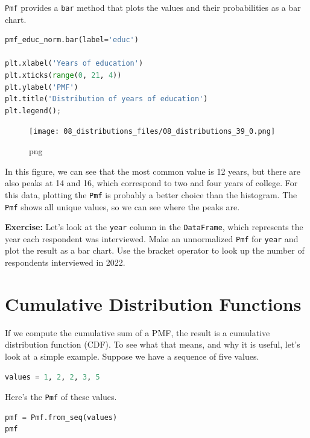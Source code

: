 \documentclass[
]{book}
\newcommand{\passthrough}[1]{#1}
\begin{document}
\passthrough{\lstinline!Pmf!} provides a \passthrough{\lstinline!bar!}
method that plots the values and their probabilities as a bar chart.

\begin{lstlisting}[language=Python]
pmf_educ_norm.bar(label='educ')

plt.xlabel('Years of education')
plt.xticks(range(0, 21, 4))
plt.ylabel('PMF')
plt.title('Distribution of years of education')
plt.legend();
\end{lstlisting}

\begin{figure}
\centering
\texttt{[image: 08\_distributions\_files/08\_distributions\_39\_0.png]}
\caption{png}
\end{figure}

In this figure, we can see that the most common value is 12 years, but
there are also peaks at 14 and 16, which correspond to two and four
years of college. For this data, plotting the
\passthrough{\lstinline!Pmf!} is probably a better choice than the
histogram. The \passthrough{\lstinline!Pmf!} shows all unique values, so
we can see where the peaks are.

\textbf{Exercise:} Let's look at the \passthrough{\lstinline!year!}
column in the \passthrough{\lstinline!DataFrame!}, which represents the
year each respondent was interviewed. Make an unnormalized
\passthrough{\lstinline!Pmf!} for \passthrough{\lstinline!year!} and
plot the result as a bar chart. Use the bracket operator to look up the
number of respondents interviewed in 2022.

\section{Cumulative Distribution
Functions}\label{cumulative-distribution-functions}

If we compute the cumulative sum of a PMF, the result is a cumulative
distribution function (CDF). To see what that means, and why it is
useful, let's look at a simple example. Suppose we have a sequence of
five values.

\begin{lstlisting}[language=Python]
values = 1, 2, 2, 3, 5  
\end{lstlisting}

Here's the \passthrough{\lstinline!Pmf!} of these values.

\begin{lstlisting}[language=Python]
pmf = Pmf.from_seq(values)
pmf
\end{lstlisting}
\end{document}
